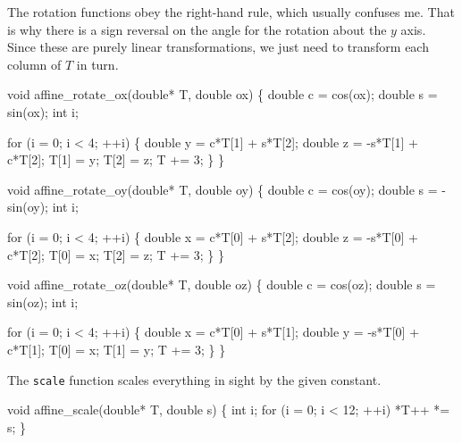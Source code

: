 The rotation functions obey the right-hand rule, which usually
confuses me.  That is why there is a sign reversal on the angle
for the rotation about the $y$ axis.  Since these are purely
linear transformations, we just need to transform each column
of $T$ in turn.

\nwenddocs{}\plusendmoddef
void affine_rotate_ox(double* T, double ox)
\{
    double c = cos(ox);
    double s = sin(ox);
    int i;

    for (i = 0; i < 4; ++i) \{
        double y =  c*T[1] + s*T[2];
        double z = -s*T[1] + c*T[2];
        T[1] = y;
        T[2] = z;
        T += 3;
    \}
\}

\nwendcode{}\nwdocspar

\nwenddocs{}\plusendmoddef
void affine_rotate_oy(double* T, double oy)
\{
    double c =  cos(oy);
    double s = -sin(oy);
    int i;

    for (i = 0; i < 4; ++i) \{
        double x =  c*T[0] + s*T[2];
        double z = -s*T[0] + c*T[2];
        T[0] = x;
        T[2] = z;
        T += 3;
    \}
\}

\nwendcode{}\nwdocspar

\nwenddocs{}\plusendmoddef
void affine_rotate_oz(double* T, double oz)
\{
    double c = cos(oz);
    double s = sin(oz);
    int i;

    for (i = 0; i < 4; ++i) \{
        double x =  c*T[0] + s*T[1];
        double y = -s*T[0] + c*T[1];
        T[0] = x;
        T[1] = y;
        T += 3;
    \}
\}

\nwendcode{}\nwdocspar

The {\tt{}scale} function scales everything in sight by the given constant.

\nwenddocs{}\plusendmoddef
void affine_scale(double* T, double s)
\{
    int i;
    for (i = 0; i < 12; ++i)
        *T++ *= s;
\}

